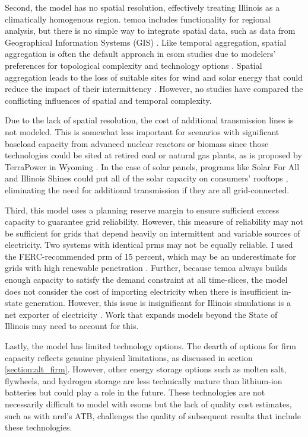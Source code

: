 Second, the model has no spatial resolution, effectively treating Illinois as a
climatically homogenous region. \gls{temoa} includes functionality for regional
analysis, but there is no simple way to integrate spatial data, such
as data from Geographical Information Systems (GIS) \cite{martinez-gordon_review_2021}.
Like temporal aggregation, spatial aggregation is often the default approach in
\gls{esom} studies due to modelers' preferences for topological complexity and
technology options \cite{martinez-gordon_review_2021,poncelet_impact_2016}. Spatial
aggregation leads to the loss of suitable sites for wind and solar energy that could
reduce the impact of their intermittency \cite{fleischer_minimising_2020}. However,
no studies have compared the conflicting influences of spatial and temporal complexity.

Due to the lack of spatial resolution, the cost of additional transmission lines
is not modeled. This is somewhat less important for scenarios with significant
baseload capacity from advanced nuclear reactors or biomass since those technologies
could be sited at retired coal or natural gas plants, as is proposed by TerraPower
in Wyoming \cite{associated_press_bill_2021}. In the case of solar panels, programs
like Solar For All and Illinois Shines \cite{chicago_illinois_nodate, noauthor_illinois_nodate}
could put all of the solar capacity on consumers' rooftops \cite{lopez_us_2012},
eliminating the need for additional transmission if they are all grid-connected.

Third, this model uses a planning reserve margin to ensure sufficient
excess capacity to guarantee grid reliability. However, this measure of reliability
may not be sufficient for grids that depend heavily on intermittent and variable
sources of electricity. Two systems with identical \glspl{prm} may not be equally
reliable. I used the FERC-recommended \gls{prm} of 15 percent, which may be
an underestimate for grids with high renewable penetration \cite{milligan_methods_2011}.
Further, because \gls{temoa} always builds enough capacity to satisfy the demand
constraint at all time-slices, the model does not consider the cost of
importing electricity when there is insufficient in-state generation. However,
this issue is insignificant for Illinois simulations is a net exporter of electricity
\cite{energy_information_administration_eia_nodate}. Work that expands models beyond
the State of Illinois may need to account for this.

Lastly, the model has limited technology options. The dearth of options for
firm capacity reflects genuine physical limitations, as discussed in section
\ref{section:alt_firm}. However, other energy storage options such as
molten salt, flywheels, and hydrogen storage are less technically mature
than lithium-ion batteries but could play a role in the future. These technologies
are not necessarily difficult to model with \glspl{esom} but the lack of quality
cost estimates, such as with \gls{nrel}'s ATB, challenges the quality of subsequent
results that include these technologies.
